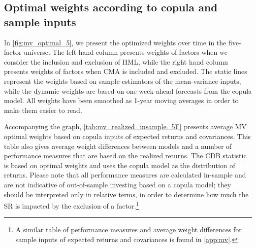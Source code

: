 \subsection{Optimal weights according to copula and sample inputs}
In \autoref{fig:mv_optimal_5}, we present the optimized weights over time in the five-factor universe. The left hand column presents weights of factors when we consider the inclusion and exclusion of HML, while the right hand column presents weights of factors when CMA is included and excluded. The static lines represent the weights based on sample estimators of the mean-variance inputs, while the dynamic weights are based on one-week-ahead forecasts from the copula model. All weights have been smoothed as 1-year moving averages in order to make them easier to read.

Accompanying the graph, \autoref{tab:mv_realized_insample_5F} presents average MV optimal weights based on copula inputs of expected returns and covariances. This table also gives average weight differences between models and a number of performance measures that are based on the realized returns. The CDB statistic is based on optimal weights and uses the copula model as the distribution of returns. Please note that all performance measures are calculated in-sample and are not indicative of out-of-sample investing based on a copula model; they should be interpreted only in relative terms, in order to determine how much the SR is impacted by the exclusion of a factor.\footnote{A similar table of performance measures and average weight differences for sample inputs of expected returns and covariances is found in \autoref{app:mv}.}

